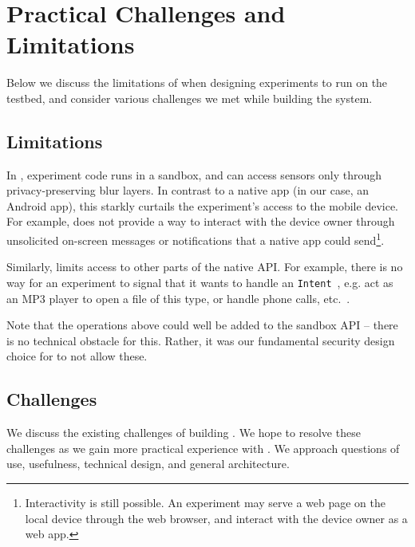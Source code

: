 \section{Practical Challenges and Limitations}\label{sec-limitation}

Below we discuss the limitations of \sysname 
when designing experiments to run on the testbed, 
and consider various challenges we met while building the system.

\subsection{Limitations}\label{subsec-limitations}
In \sysname, experiment code runs in a sandbox, and 
can access sensors only through privacy-preserving blur layers. 
In contrast to a native app (in our case, an Android app), this starkly curtails 
the experiment's access to the mobile device. For example, \sysname 
does not provide a way to interact with the device owner 
through unsolicited on-screen messages or notifications that a native 
app could send\footnote{\scriptsize Interactivity is still possible. 
An experiment may serve a web 
page on the local device through the web browser, and interact with 
the device owner as a web app.}. 

Similarly, \sysname limits access to other parts 
of the native API. For example, there is no way for an experiment to 
signal that it wants to handle an \texttt{Intent}~\cite{intent}, e.g. 
act as an MP3 player to open a file of this type, or handle phone calls, 
etc.~\cite{intent-dev}.

Note that the operations above 
could well be added to the sandbox API -- there is no technical 
obstacle for this. Rather, it was our fundamental security design 
choice for \sysname to not allow these.


\subsection{Challenges}\label{subsec-challenges}

We discuss the existing challenges of building \sysname. We hope to 
resolve these challenges as we gain more practical experience with 
\sysname.
We approach questions of use, usefulness, technical design, and
general architecture.


